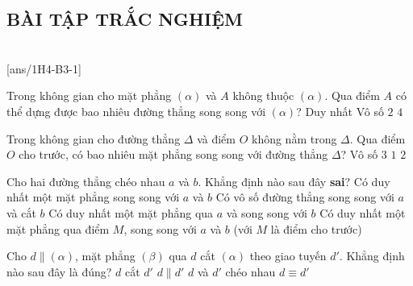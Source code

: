 \NOTE \subsection{BÀI TẬP TRẮC NGHIỆM}
 \\
\setcounter{ex}{0}
[ans/1H4-B3-1]
\begin{ex} Trong không gian cho mặt phẳng $(\alpha)$ và $A$ không thuộc $(\alpha)$. Qua điểm $A$ có thể dựng được bao nhiêu đường thẳng song song với $(\alpha)$?
	\choice
	{Duy nhất}
	{\True Vô số }
	{$2$}
	{$4$}
	\loigiai{}
\end{ex}
\begin{ex}%
	Trong không gian cho đường thẳng $\Delta$ và điểm $O$ không nằm trong $\Delta$. Qua điểm $O$ cho trước, có bao nhiêu mặt phẳng song song với đường thẳng $\Delta$?
	\choice
	{\True Vô số}
	{ $3$}
	{ $1$}
	{ $2$}
\end{ex}

\begin{ex}%
	Cho hai đường thẳng chéo nhau $a$ và $b$. Khẳng định nào sau đây \textbf{sai}?
	\choice
	{\True Có duy nhất một mặt phẳng song song với $a$ và $b $}
	{Có vô số đường thẳng song song với $a$ và cắt $b $}
	{Có duy nhất một mặt phẳng qua $a$ và song song với $b $}
	{Có duy nhất một mặt phẳng qua điểm $M$, song song với $a$ và $b$ (với $M$ là điểm cho trước)}
\end{ex}


\begin{ex}%
	Cho $d\parallel \left(\alpha \right)$, mặt phẳng $\left(\beta \right)$ qua $d$ cắt $\left(\alpha \right)$ theo giao tuyến $d'$. Khẳng định nào sau đây là đúng?
	\choice
	{$d$ cắt $d'$}
	{\True $d\parallel d' $}
	{$d$ và $d'$ chéo nhau}
	{$d\equiv d' $}
\end{ex}

